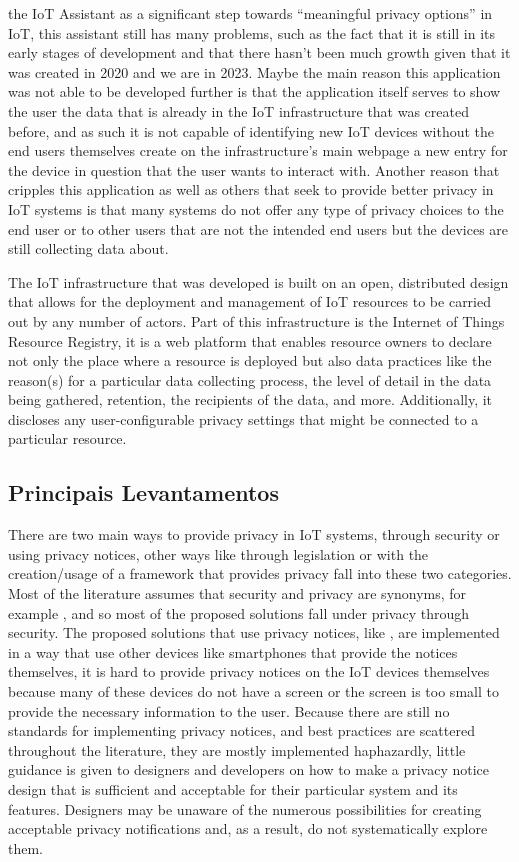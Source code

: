 \documentclass[conference]{IEEEtran}
\begin{document}
the IoT Assistant as a significant step towards ``meaningful privacy options''
in IoT, this assistant still has many problems, such as the fact that it
is still in its early stages of development and that there hasn't been much
growth given that it was created in 2020 and we are in 2023. Maybe the main
reason this application was not able to be developed further is that the
application itself serves to show the user the data that is already in the
IoT infrastructure that was created before, and as such it is not capable
of identifying new IoT devices without the end users themselves create on
the infrastructure's main webpage \cite{DasPersonalized} a new entry for
the device in question that the user wants to interact with. Another reason
that cripples this application as well as others that seek to provide better
privacy in IoT systems is that many systems do not offer any type of privacy
choices to the end user or to other users that are not the intended end
users but the devices are still collecting data about.

The IoT infrastructure that was developed \cite{DasPersonalized} is built
on an open, distributed design that allows for the deployment and management
of IoT resources to be carried out by any number of actors. Part of this
infrastructure is the Internet of Things Resource Registry, it is a web
platform that enables resource owners to declare not only the place where
a resource is deployed but also data practices like the reason(s) for a
particular data collecting process, the level of detail in the data being
gathered, retention, the recipients of the data, and more. Additionally,
it discloses any user-configurable privacy settings that might be connected
to a particular resource.

\subsection{Principais Levantamentos}

There are two main ways to provide privacy in IoT systems, through security
or using privacy notices, other ways like through legislation or with the
creation/usage of a framework that provides privacy fall into these two
categories. Most of the literature assumes that security and privacy are
synonyms, for example \cite{opara2022framework, FabianoInternet, SunSecure},
and so most of the proposed solutions fall under privacy through security.
The proposed solutions that use privacy notices, like \cite{FengDesign},
are implemented in a way that use other devices like smartphones that provide
the notices themselves, it is hard to provide privacy notices on the IoT
devices themselves because many of these devices do not have a screen or
the screen is too small to provide the necessary information to the user.
Because there are still no standards for implementing privacy notices, and
best practices are scattered throughout the literature, they are mostly
implemented haphazardly, little guidance is given to designers and developers
on how to make a privacy notice design that is sufficient and acceptable
for their particular system and its features. Designers may be unaware of
the numerous possibilities for creating acceptable privacy notifications
and, as a result, do not systematically explore them.
\end{document}
